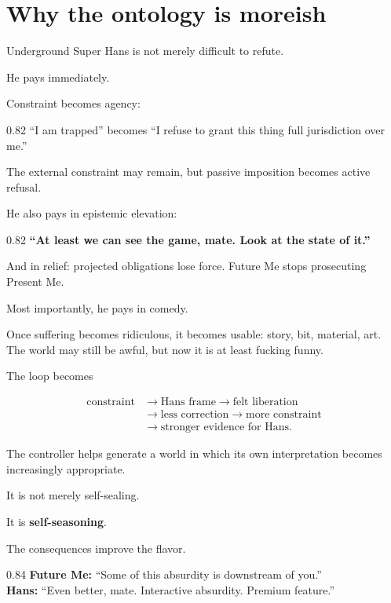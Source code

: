 \documentclass[10pt,letterpaper]{article}
\newenvironment{paperbody}
  {\begingroup\justifying}
  {\par\endgroup}
\newenvironment{voicebox}
  {\Needspace{3.5\baselineskip}\par\vspace{0.22em}\begin{center}\begingroup
   \begin{lrbox}{\voiceboxsave}\begin{varwidth}{0.82\linewidth}
   \small\rmfamily\upshape\RaggedRight}
  {\end{varwidth}\end{lrbox}\fbox{\usebox{\voiceboxsave}}
   \endgroup\end{center}\vspace{0.22em}}
\newenvironment{dialoguebox}
  {\Needspace{5\baselineskip}\par\vspace{0.26em}\begin{center}\begingroup
   \begin{lrbox}{\dialogueboxsave}\begin{varwidth}{0.84\linewidth}
   \small\rmfamily\upshape\RaggedRight}
  {\end{varwidth}\end{lrbox}\fbox{\usebox{\dialogueboxsave}}
   \endgroup\end{center}\vspace{0.26em}}
\let\oldsection\section
\renewcommand{\section}{\Needspace{6\baselineskip}\oldsection}
\begin{document}
\begin{paperbody}
\section{Why the ontology is
moreish}\label{why-the-ontology-is-moreish}

Underground Super Hans is not merely difficult to refute.

He pays immediately.

Constraint becomes agency:

\begin{voicebox}
``I am trapped'' becomes ``I refuse to grant this thing full
jurisdiction over me.''
\end{voicebox}

The external constraint may remain, but passive imposition becomes
active refusal.

He also pays in epistemic elevation:

\begin{voicebox}
\textbf{``At least we can see the game, mate. Look at the state of
it.''}
\end{voicebox}

And in relief: projected obligations lose force. Future Me stops
prosecuting Present Me.

Most importantly, he pays in comedy.

Once suffering becomes ridiculous, it becomes usable: story, bit,
material, art. The world may still be awful, but now it is at least
fucking funny.

The loop becomes

\[
\begin{aligned}
\text{constraint} &\to \text{Hans frame} \to \text{felt liberation} \\
&\to \text{less correction} \to \text{more constraint} \\
&\to \text{stronger evidence for Hans}.
\end{aligned}
\]

The controller helps generate a world in which its own interpretation
becomes increasingly appropriate.

It is not merely self-sealing.

It is \textbf{self-seasoning}.

The consequences improve the flavor.

\begin{dialoguebox}
\textbf{Future Me:} ``Some of this absurdity is downstream of you.''\\[0.35em]
\textbf{Hans:} ``Even better, mate. Interactive absurdity. Premium
feature.''
\end{dialoguebox}


\end{paperbody}
\end{document}
